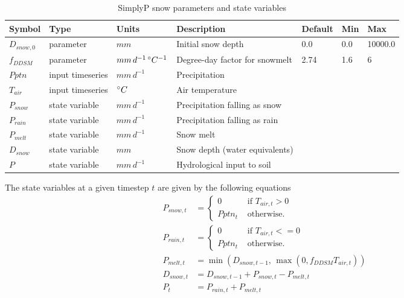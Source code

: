 \documentclass[11pt]{article}
\theoremstyle{definition}
\begin{document}
\begin{table}[H]
\centering
\label{tab:simplypsnow}
\begin{tabular}{|lllllll|}
\hline
Symbol & Type & Units & Description & Default & Min & Max \\
\hline
$D_{snow,0}$ & parameter & $mm$                                    & Initial snow depth & 0.0 & 0.0 & 10000.0\\
$f_{DDSM}$    & parameter & $mm\, d^{-1}\, \degree C^{-1}$ & Degree-day factor for snowmelt & 2.74 &1.6 & 6\\
\hline
$Pptn$            & input timeseries &  $mm\, d^{-1}$                     & Precipitation & & & \\
$T_{air}$        & input timeseries & $\degree C$                           & Air temperature & & & \\
\hline
$P_{snow}$   & state variable &  $mm\, d^{-1}$               & Precipitation falling as snow & & & \\
$P_{rain}$     & state variable &   $mm\, d^{-1}$              & Precipitation falling as rain & & & \\
$P_{melt}$   & state variable &  $mm\, d^{-1}$                & Snow melt & & & \\
$D_{snow}$   & state variable & $mm$                                & Snow depth (water equivalents) & & & \\
$P$               & state variable &  $mm\, d^{-1}$                & Hydrological input to soil & & &\\
\hline
\end{tabular}
\caption{SimplyP snow parameters and state variables}
\end{table}
The state variables at a given timestep $t$ are given by the following equations
\begin{align*}
P_{snow,t} &= \begin{cases}
0 & \mbox{ if }T_{air,t} > 0\\
Pptn_t & \mbox{ otherwise.}
\end{cases}\\
P_{rain,t} &= \begin{cases}
0 & \mbox{ if }T_{air,t} <= 0\\
Pptn_t & \mbox{ otherwise.}
\end{cases}\\
P_{melt,t} &= \min(D_{snow,t-1},  \,\max(0, f_{DDSM}T_{air,t}))\\
D_{snow,t} &= D_{snow,t-1}+P_{snow,t}-P_{melt,t}\\
P_t &= P_{rain,t} + P_{melt,t}
\end{align*}
\end{document}
